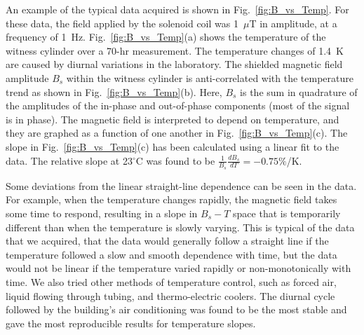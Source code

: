 An example of the typical data acquired is shown in
Fig.~\ref{fig:B_vs_Temp}.  For these data, the field applied by the
solenoid coil was 1~$\mu$T in amplitude, at a frequency of 1~Hz.
Fig.~\ref{fig:B_vs_Temp}(a) shows the temperature of the witness
cylinder over a 70-hr measurement.  The temperature changes of 1.4~K
are caused by diurnal variations in the laboratory.  The shielded
magnetic field amplitude $B_s$ within the witness cylinder is
anti-correlated with the temperature trend as shown in
Fig.~\ref{fig:B_vs_Temp}(b).  Here, $B_s$ is the sum in quadrature of
the amplitudes of the in-phase and out-of-phase components (most of
the signal is in phase).  The magnetic field is interpreted to depend
on temperature, and they are graphed as a function of one another in
Fig.~\ref{fig:B_vs_Temp}(c).  The slope in Fig.~\ref{fig:B_vs_Temp}(c)
has been calculated using a linear fit to the data.  The relative
slope at 23$^\circ$C was found to be
$\frac{1}{B_s}\frac{dB_s}{dT}=-0.75\%$/K.

Some deviations from the linear straight-line dependence can be seen
in the data.  For example, when the temperature changes rapidly, the
magnetic field takes some time to respond, resulting in a slope in
$B_s-T$ space that is temporarily different than when the temperature
is slowly varying.  This is typical of the data that we acquired, that
the data would generally follow a straight line if the temperature
followed a slow and smooth dependence with time, but the data would
not be linear if the temperature varied rapidly or non-monotonically
with time.  We also tried other methods of temperature control, such
as forced air, liquid flowing through tubing, and thermo-electric
coolers.  The diurnal cycle followed by the building's air
conditioning was found to be the most stable and gave the most
reproducible results for temperature slopes.

